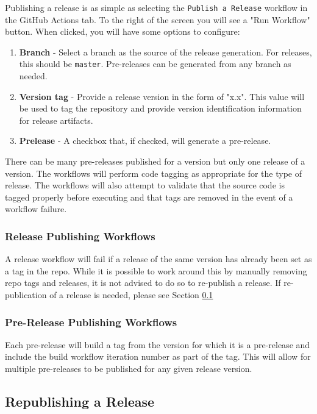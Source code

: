 Publishing a release is as simple as selecting the \texttt{Publish a Release}
workflow in the GitHub Actions tab.  To the right of the screen you will see
a "Run Workflow" button.  When clicked, you will have some options to configure:

\begin{enumerate}
    \item \textbf{Branch} - Select a branch as the source of the release generation.  For
    releases, this should be \texttt{master}.  Pre-releases can be generated from
    any branch as needed.
    \item \textbf{Version tag} - Provide a release version in the form of "x.x".  This value
    will be used to tag the repository and provide version identification information
    for release artifacts.
    \item \textbf{Prelease} - A checkbox that, if checked, will generate a pre-release.
\end{enumerate}

There can be many pre-releases published for a version but only one release of a version.
The workflows will perform code tagging as appropriate for the type of release.  The
workflows will also attempt to validate that the source code is tagged properly before
executing and that tags are removed in the event of a workflow failure.

\subsubsection{Release Publishing Workflows}

A release workflow will fail if a release of the same version has already been
set as a tag in the repo.  While it is possible to work around this by manually
removing repo tags and releases, it is not advised to do so to re-publish a release.
If re-publication of a release is needed, please see Section \ref{sec:republish}


\subsubsection{Pre-Release Publishing Workflows}

Each pre-release will build a tag from the version for which it is a pre-release
and include the build workflow iteration number as part of the tag.  This will allow
for multiple pre-releases to be published for any given release version.

\subsection{Republishing a Release}\label{sec:republish}

